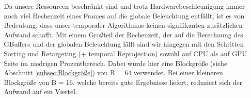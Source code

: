 Da unsere Ressourcen beschränkt sind und trotz Hardwarebeschleunigung immer noch viel Rechenzeit eines Frames auf die globale Beleuchtung entfällt,
ist es von Bedeutung, dass unser temporaler Algorithmus keinen signifikanten zusätzlichen Aufwand schafft.
Mit einem Großteil der Rechenzeit, der auf die Berechnung des GBuffers und der globalen Beleuchtung fällt sind wir hingegen 
mit den Schritten Sorting und Retargeting (+ temporal Reprojection) sowohl auf  CPU als auf GPU Seite im niedrigen Prozentbereich.
Dabei wurde hier eine Blockgröße (siehe Abschnitt \ref{subsec:Blockgröße}) von B = 64 verwendet. Bei einer kleineren Blockgröße von B = 16, welche 
bereits gute Ergebnisse liefert, reduziert sich der Aufwand auf ein Viertel. 
\par
{}%
